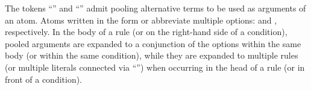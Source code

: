 The tokens ``\code{;}'' and ``\code{;;}'' admit pooling alternative terms
to be used as arguments of an atom. %
Atoms written in the form 
or  abbreviate multiple options:
 and
, respectively.
In the body of a rule (or on the right-hand side of a condition),
pooled arguments are expanded to a conjunction
of the options within the same body (or within the same condition),
while they are expanded to multiple rules (or multiple literals connected via ``\code{,}'')
when occurring in the head of a rule (or in front of a condition).

